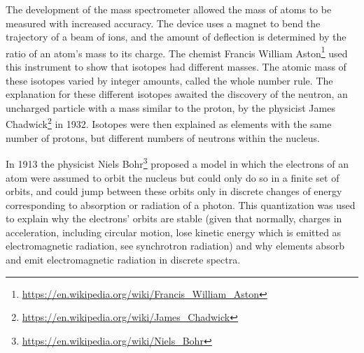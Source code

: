 \documentclass[
]{book}
\renewcommand{\href}[2]{#2\footnote{\url{#1}}}
\begin{document}
The development of the mass spectrometer allowed the mass of atoms to be measured with increased accuracy. The device uses a magnet to bend the trajectory of a beam of ions, and the amount of deflection is determined by the ratio of an atom's mass to its charge. The chemist \href{https://en.wikipedia.org/wiki/Francis_William_Aston}{Francis William Aston} used this instrument to show that isotopes had different masses. The atomic mass of these isotopes varied by integer amounts, called the whole number rule. The explanation for these different isotopes awaited the discovery of the neutron, an uncharged particle with a mass similar to the proton, by the physicist \href{https://en.wikipedia.org/wiki/James_Chadwick}{James Chadwick} in 1932. Isotopes were then explained as elements with the same number of protons, but different numbers of neutrons within the nucleus.

In 1913 the physicist \href{https://en.wikipedia.org/wiki/Niels_Bohr}{Niels Bohr} proposed a model in which the electrons of an atom were assumed to orbit the nucleus but could only do so in a finite set of orbits, and could jump between these orbits only in discrete changes of energy corresponding to absorption or radiation of a photon. This quantization was used to explain why the electrons' orbits are stable (given that normally, charges in acceleration, including circular motion, lose kinetic energy which is emitted as electromagnetic radiation, see synchrotron radiation) and why elements absorb and emit electromagnetic radiation in discrete spectra.
\end{document}
